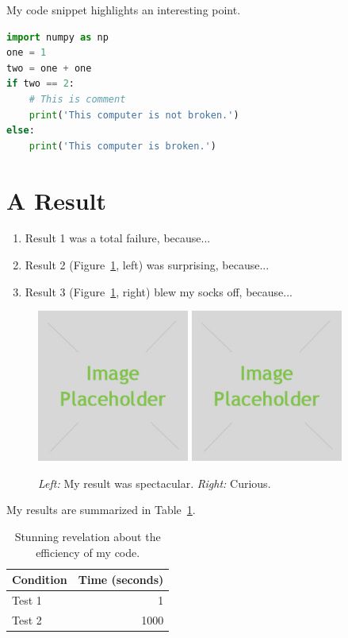 My code snippet highlights an interesting point.
\begin{lstlisting}[language=python]
import numpy as np
one = 1
two = one + one
if two == 2:
	# This is comment
    print('This computer is not broken.')
else:
    print('This computer is broken.')
\end{lstlisting}

\section*{A Result}

\begin{enumerate}
    \item Result 1 was a total failure, because...
    \item Result 2 (Figure~\ref{fig:result1}, left) was surprising, because...
    \item Result 3 (Figure~\ref{fig:result1}, right) blew my socks off, because...
\end{enumerate}

\begin{figure}[h]
    \centering
    \includegraphics[width=5cm]{placeholder.jpg}
    \includegraphics[width=5cm]{placeholder.jpg}
    \caption{\emph{Left:} My result was spectacular. \emph{Right:} Curious.}
    \label{fig:result1}
\end{figure}

My results are summarized in Table~\ref{tab:table1}.

\begin{table}[h]
    \centering
    \begin{tabular}{lr}
        \toprule
        Condition & Time (seconds) \\
        \midrule
        Test 1 & 1 \\
        Test 2 & 1000 \\
        \bottomrule
    \end{tabular}
    \caption{Stunning revelation about the efficiency of my code.}
    \label{tab:table1}
\end{table}

